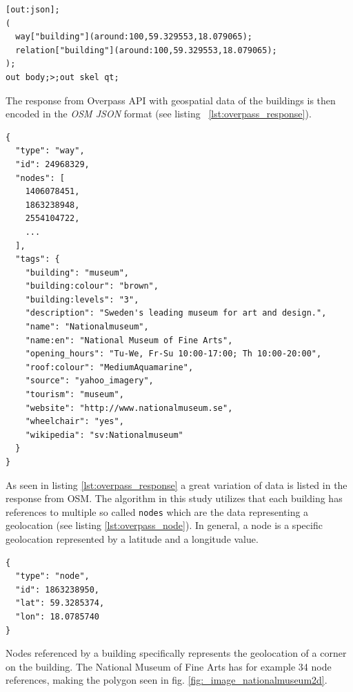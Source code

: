 \begin{lstlisting}[caption={Example query to Overpass API, given in Overpass QL, with r set to 100 and L set to (59.329553,18.079065).}, label={lst:overpass_query}]
[out:json];
(
  way["building"](around:100,59.329553,18.079065);
  relation["building"](around:100,59.329553,18.079065);
);
out body;>;out skel qt;
\end{lstlisting}

The response from Overpass API with geospatial data of the buildings is then encoded in the \textit{OSM JSON} format (see listing ~\ref{lst:overpass_response}).

\begin{lstlisting}[caption={Example response from Overpass API of the National Museum of Fine Arts in Stockholm, Sweden, given in OSM JSON.}, label={lst:overpass_response}]
{
  "type": "way",
  "id": 24968329,
  "nodes": [
    1406078451,
    1863238948,
    2554104722,
    ...
  ],
  "tags": {
    "building": "museum",
    "building:colour": "brown",
    "building:levels": "3",
    "description": "Sweden's leading museum for art and design.",
    "name": "Nationalmuseum",
    "name:en": "National Museum of Fine Arts",
    "opening_hours": "Tu-We, Fr-Su 10:00-17:00; Th 10:00-20:00",
    "roof:colour": "MediumAquamarine",
    "source": "yahoo_imagery",
    "tourism": "museum",
    "website": "http://www.nationalmuseum.se",
    "wheelchair": "yes",
    "wikipedia": "sv:Nationalmuseum"
  }
}
\end{lstlisting}

As seen in listing \ref{lst:overpass_response} a great variation of data is listed in the response from OSM. The algorithm in this study utilizes that each building has references to multiple so called \texttt{nodes} which are the data representing a geolocation (see listing \ref{lst:overpass_node}). In general, a node is a specific geolocation represented by a latitude and a longitude value. 

\begin{lstlisting}[caption={Node that is referenced by the National Museum of Fine Arts in Stockholm given in OSM JSON.}, label={lst:overpass_node}]
{
  "type": "node",
  "id": 1863238950,
  "lat": 59.3285374,
  "lon": 18.0785740
}
\end{lstlisting}

Nodes referenced by a building specifically represents the geolocation of a corner on the building.  The National Museum of Fine Arts has for example 34 node references, making the polygon seen in fig. \ref{fig:_image_nationalmuseum2d}.

